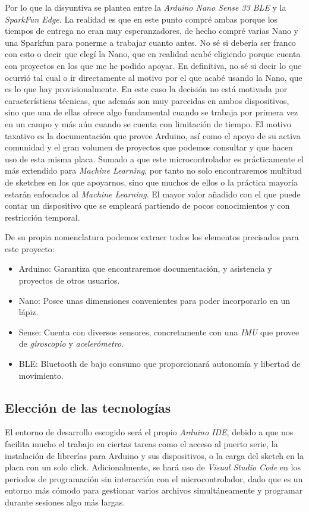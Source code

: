 Por lo que la disyuntiva se plantea entre la \textit{Arduino Nano Sense 33 BLE}
y la \textit{SparkFun Edge}. {\color{green}La realidad es que en este punto
compré ambas porque los tiempos de entrega no eran muy esperanzadores, de hecho
compré varias Nano y una Sparkfun para ponerme a trabajar cuanto antes.
No sé si debería ser franco con esto o decir que elegí la Nano, que en realidad
acabé eligiendo porque cuenta con proyectos en los que me he podido
apoyar. En definitiva, no sé si decir lo que ocurrió tal cual o ir directamente
al motivo por el que acabé usando la Nano, que es lo que hay provisionalmente}.
En este caso la decisión no está motivada por características técnicas, que
además son muy parecidas en ambos dispositivos, sino que una de ellas ofrece
algo fundamental cuando se trabaja por primera vez en un campo y más aún
cuando se cuenta con limitación de tiempo.
El motivo taxativo es la documentación que provee Arduino, así como el apoyo
de su activa comunidad y el gran volumen de proyectos que podemos consultar y
que hacen uso de esta misma placa. Sumado a que este microcontrolador es
prácticamente el más extendido para \textit{Machine Learning}, por tanto
no solo encontraremos multitud de sketches en los que apoyarnos, sino que
muchos de ellos o la práctica mayoría estarán enfocados al \textit{Machine
Learning}. El mayor valor añadido con el que puede contar un dispositivo
que se empleará partiendo de pocos conocimientos y con restricción temporal.

De su propia nomenclatura podemos extraer todos los elementos precisados para
este proyecto:
\begin{itemize}
    \itemsep0em 
    \item Arduino: Garantiza que encontraremos documentación, y asistencia
    y proyectos de otros usuarios.
    \item Nano: Posee unas dimensiones convenientes para poder incorporarlo
    en un lápiz.
    \item Sense: Cuenta con diversos sensores, concretamente con una \textit{IMU}
    que provee de \textit{giroscopio} y \textit{acelerómetro}.
    \item BLE: Bluetooth de bajo consumo que proporcionará autonomía
    y libertad de movimiento.
\end{itemize}

\subsection{Elección de las tecnologías}
El entorno de desarrollo escogido será el propio \textit{Arduino IDE}, debido
a que nos facilita mucho el trabajo en ciertas tareas como el acceso al puerto
serie, la instalación de librerías para Arduino y sus dispositivos, o la carga
del sketch en la placa con un solo click. Adicionalmente, se hará uso de
\textit{Visual Studio Code} en los periodos de programación sin interacción
con el microcontrolador, dado que es un entorno más cómodo para gestionar
varios archivos simultáneamente y programar durante sesiones algo más largas.

